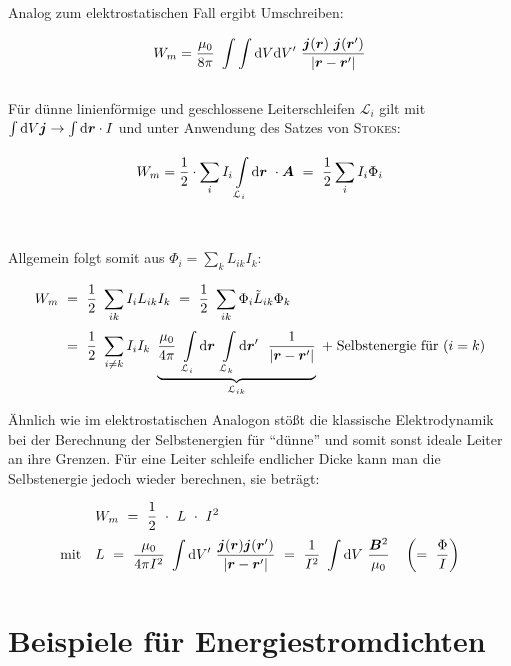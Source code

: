 Analog zum elektrostatischen Fall ergibt Umschreiben:

\begin{equation*}
W_m = \frac{\mu_0}{8\pi} \ \int\int\d V \d V' \ \frac{\vec{j}(\vec{r}) \ \vec{j}(\vec{r}')}{|\vec{r}-\vec{r}'|}
\end{equation*}
\ \\

Für dünne linienförmige und geschlossene Leiterschleifen $\mathcal{L}_i$ gilt mit $\int\mathrm{d} V\bm{j} \rightarrow \int\mathrm{d} \bm{r} \cdot I$ und unter Anwendung des Satzes von \textsc{Stokes}:

\begin{equation*}
W_m = \frac{1}{2} \cdot \sum_i I_i \int\limits_{{\mathcal{L}_i}}^{{}}\mathrm{d}{\bm{r}}\  \cdot \bm{A} \ = \ \frac{1}{2} \sum_i I_i \Phi_i
\end{equation*}
\ \\
\ \\
Allgemein folgt somit aus $\Phi_i = \sum_k L_{ik} I_k$:

\begin{align*}
W_m \ &= \ \frac{1}{2} \ \sum_{ik}  I_i L_{ik} I_k \ = \ \frac{1}{2} \ \sum_{ik} \Phi_i \tilde{L}_{ik} \Phi_k\\
&= \ \frac{1}{2} \ \sum_{i\neq k} I_i I_k \ \underbrace{\frac{\mu_0}{4\pi} \ \Int{\mathcal{L}_i}{}{\vec{r}} \Int{\mathcal{L}_k}{}{\vec{r}'} \ \frac{1}{|\vec{r}-\vec{r}'|}}_{\mathcal{L}_{ik}} \; + \; \text{Selbstenergie für } (i=k)
\end{align*}

Ähnlich wie im elektrostatischen Analogon stößt die klassische Elektrodynamik bei der Berechnung der Selbstenergien für ``dünne'' und somit sonst ideale Leiter an ihre Grenzen. Für eine Leiter schleife endlicher Dicke kann man die Selbstenergie jedoch wieder berechnen, sie beträgt:

\begin{align*}
& \ W_m  \ = \ \frac{1}{2} \ \cdot  \ L \ \cdot \ I^2 \\
\text{mit } \ & \ L \ = \ \frac{\mu_0}{4\pi I^2}\ \Int{}{}{V'} \frac{\vec{j}(\vec{r})\vec{j}(\vec{r}')}{|\vec{r}-\vec{r}'|} \ = \ \frac{1}{I^2} \ \Int{}{}{V} \frac{\vec{B}^2}{\mu_0} \quad
\left( = \ \frac{\Phi}{I}\right) 
\end{align*}

\section{Beispiele für Energiestromdichten}

